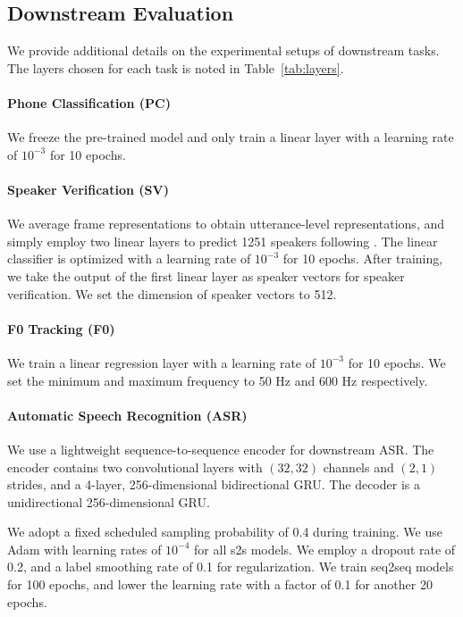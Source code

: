 \documentclass[11pt,a4paper]{article}
\begin{document}
%
%
%
%
%
%
%
%
%
%
%
%
%
%
%
%
%
%
%
%
%
%
%
%

\subsection{Downstream Evaluation}
\label{appendix:downstream}

We provide additional details on the experimental setups of downstream tasks. 
The layers chosen for each task is noted in Table~\ref{tab:layers}.

\paragraph{Phone Classification (PC)}
We freeze the pre-trained model and only train a linear layer with a learning rate of $10^{-3}$ for 10 epochs.

\paragraph{Speaker Verification (SV)}

We average frame representations to obtain utterance-level representations, and simply
employ two linear layers to predict 1251 speakers following \citep{Fan2020ExploringW2}. 
The linear classifier is optimized with a learning rate of $10^{-3}$ for 10 epochs.
After training, we take the output of the first linear layer as speaker vectors for speaker verification.
We set the dimension of speaker vectors to 512.

\paragraph{F0 Tracking (F0)}
We train a linear regression layer with a learning rate of $10^{-3}$ for 10 epochs.
We set the minimum and maximum frequency to 50 Hz and 600 Hz respectively.

\paragraph{Automatic Speech Recognition (ASR)}

We use a lightweight sequence-to-sequence encoder for downstream ASR.
The encoder contains two convolutional layers with $(32, 32)$ channels and $(2, 1)$ strides,
and a 4-layer, 256-dimensional bidirectional GRU. The decoder is a unidirectional 256-dimensional GRU.

We adopt a fixed scheduled sampling probability of 0.4 during training. 
We use Adam with learning rates of $10^{-4}$ for all s2s models. 
We employ a dropout rate of 0.2, and a label smoothing rate of 0.1 for regularization. 
%
%
%
We train seq2seq models for 100 epochs, 
and lower the learning rate with a factor of 0.1 for another 20 epochs.

%
%
%
%
%

%
%
%
%
%
%

%
%
%
%
%
%
%
%
%
%

%
%
%
%
%
%
%
%
%
%
%
%
%
%
%
%
%

\end{document}
